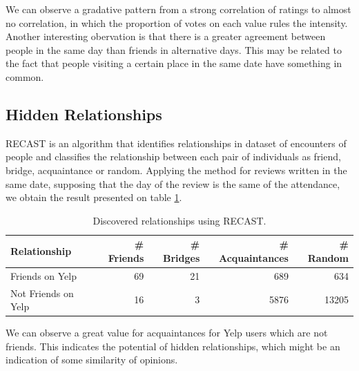 We can observe a gradative pattern from a strong correlation of ratings to
almost no correlation, in which the proportion of votes on each value rules
the intensity. Another interesting obervation is that there is a greater
agreement between people in the same day than friends in alternative days. This
may be related to the fact that people visiting a certain place in the same date
have something in common.

\subsection{Hidden Relationships}
RECAST\cite{vaz2013recast} is an algorithm that identifies relationships in
dataset of encounters of people and classifies the relationship between each
pair of individuals as friend, bridge, acquaintance or random. Applying the
method for reviews written in the same date, supposing that the day of
the review is the same of the attendance, we obtain the result presented on
table \ref{tab:recast}.

\begin{table}[H]
\begin{tabular}{l|rrrr}
Relationship & \# Friends & \# Bridges & \# Acquaintances & \# Random \\ 
\hline
Friends on Yelp & 69 & 21 & 689 & 634 \\
Not Friends on Yelp & 16 & 3 & 5876 & 13205 \\
\end{tabular}
\caption{Discovered relationships using RECAST.}
\label{tab:recast}
\end{table}

We can observe a great value for acquaintances for Yelp users which are not
friends. This indicates the potential of hidden relationships, which might be an
indication of some similarity of opinions.
